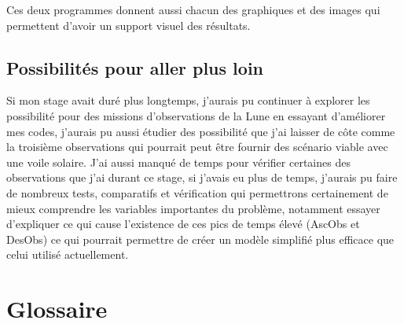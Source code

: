 \documentclass[12pt]{article} %
\begin{document}
		Ces deux programmes donnent aussi chacun des graphiques et des images qui permettent d'avoir un support visuel des résultats.
		
		\subsection{Possibilités pour aller plus loin}
		Si mon stage avait duré plus longtemps, j'aurais pu continuer à explorer les possibilité pour des missions d'observations de la Lune en essayant d'améliorer mes codes, j'aurais pu aussi étudier des possibilité que j'ai laisser de côte comme la troisième observations qui pourrait peut être fournir des scénario viable avec une voile solaire. J'ai aussi manqué de temps pour vérifier certaines des observations que j'ai durant ce stage, si j'avais eu plus de temps, j'aurais pu faire de nombreux tests, comparatifs et vérification qui permettrons certainement de mieux comprendre les variables importantes du problème, notamment essayer d'expliquer ce qui cause l'existence de ces pics de temps élevé (\gls{AscObs} et \gls{DesObs}) ce qui pourrait permettre de créer un modèle simplifié plus efficace que celui utilisé actuellement.
		
		\vfill
		
		\section{Glossaire}
		
		\printglossaries
		
		
		
\end{document}
